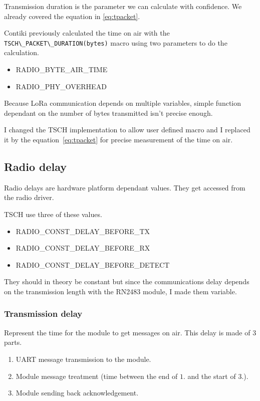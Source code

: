Transmission duration is the parameter we can calculate with confidence.
We already covered the equation in \ref{eq:tpacket}.

Contiki previously calculated the time on air with the
\lstinline{TSCH\_PACKET\_DURATION(bytes)} macro using two parameters to do the
calculation.

\begin{itemize}
    \item RADIO\_BYTE\_AIR\_TIME
    \item RADIO\_PHY\_OVERHEAD
\end{itemize}

Because LoRa communication depends on multiple variables, simple function
dependant on the number of bytes transmitted isn't precise enough.

I changed the TSCH implementation to allow user defined macro and
I replaced it by the equation~\ref{eq:tpacket} for precise measurement
of the time on air.

\subsection{Radio delay}

Radio delays are hardware platform dependant values. 
They get accessed from the radio driver.

TSCH use three of these values.

\begin{itemize}
  \item RADIO\_CONST\_DELAY\_BEFORE\_TX
  \item RADIO\_CONST\_DELAY\_BEFORE\_RX
  \item RADIO\_CONST\_DELAY\_BEFORE\_DETECT
\end{itemize}

They should in theory be constant but since the communications delay depends
on the transmission length with the RN2483 module, I made them variable.


\subsubsection{Transmission delay}

Represent the time for the module to get messages on air. 
This delay is made of 3 parts.

\begin{enumerate}
  \item UART message transmission to the module.
  \item Module message treatment (time between the end of $1.$ and the start of $3.$).
  \item Module sending back acknowledgement.
\end{enumerate}

